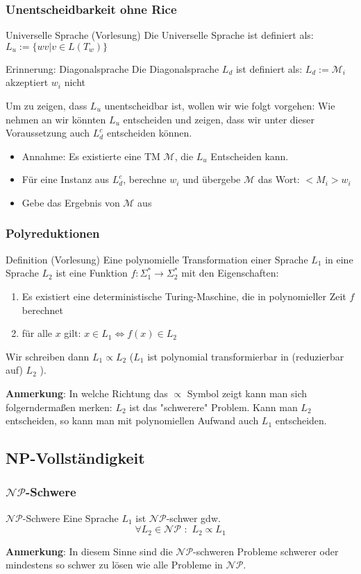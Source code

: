 \documentclass{beamer}
\begin{document}
{\begin{frame}
\frametitle{Unentscheidbarkeit ohne Rice}
\begin{block}{Universelle Sprache (Vorlesung)}
Die Universelle Sprache ist definiert als: $L_u := \{wv | v \in L(T_w)\}$
\end{block}
\begin{block}{Erinnerung: Diagonalsprache}
Die Diagonalsprache $L_d$ ist definiert als: $L_d := \mathcal{M}_i$ akzeptiert $w_i$ nicht
\end{block}
Um zu zeigen, dass $L_u$ unentscheidbar ist, wollen wir wie folgt vorgehen: Wie nehmen an wir könnten $L_u$ entscheiden und zeigen, dass wir unter dieser Voraussetzung auch $L_d^c$ entscheiden können.
\begin{itemize}
\item Annahme: Es existierte eine TM $\mathcal{M}$, die $L_u$ Entscheiden kann.
\item Für eine Instanz aus $L_d^c$, berechne $w_i$ und übergebe $\mathcal{M}$ das Wort: $<M_i>w_i$
\item Gebe das Ergebnis von $\mathcal{M}$ aus
\end{itemize}
\end{frame}

\begin{frame}
\frametitle{Polyreduktionen}
\begin{block}{Definition (Vorlesung)}
Eine polynomielle Transformation einer Sprache $L_1$ in eine Sprache $L_2$ ist eine Funktion
$f: \Sigma^*_1 \rightarrow \Sigma^*_2$ mit den Eigenschaften:
\begin{enumerate}
\item Es existiert eine deterministische Turing-Maschine, die in polynomieller Zeit $f$ berechnet
\item für alle $x$ gilt: $x \in L_1 \iff f(x) \in  L_2$
\end{enumerate}
Wir schreiben dann $L_1 \propto L_2$ ($L_1$ ist polynomial transformierbar in (reduzierbar auf) $L_2$ ).
\end{block}
\textbf{Anmerkung}: In welche Richtung das $\propto$ Symbol zeigt kann man sich folgerndermaßen  merken:
$L_2$ ist das "schwerere" Problem. Kann man $L_2$ entscheiden, so kann man mit polynomiellen Aufwand auch $L_1$ entscheiden.
\end{frame}


\subsection{NP-Vollständigkeit}
\begin{frame}
\frametitle{$\mathcal{NP}$-Schwere}
\begin{block}{$\mathcal{NP}$-Schwere}
Eine Sprache $L_1$ ist $\mathcal{NP}$-schwer gdw. 
\[\forall L_2 \in \mathcal{NP} \,\, : \,\, L_2 \propto L_1\]
\end{block}
\textbf{Anmerkung}: In diesem Sinne sind die $\mathcal{NP}$-schweren Probleme schwerer oder mindestens so schwer zu lösen wie alle Probleme in $\mathcal{NP}$.
\end{frame}

}
\end{document}
